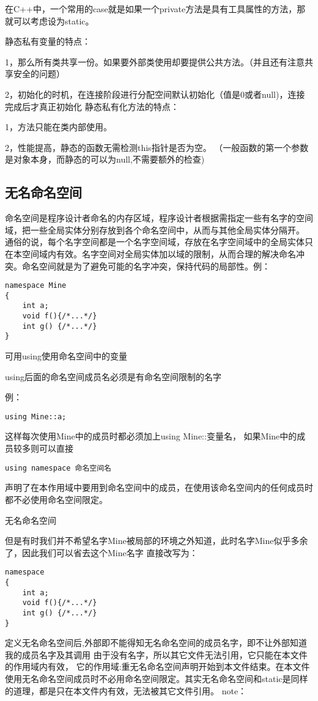 在C++中，一个常用的case就是如果一个private方法是具有工具属性的方法，那就可以考虑设为static。

静态私有变量的特点：

1，那么所有类共享一份。如果要外部类使用却要提供公共方法。（并且还有注意共享安全的问题）

2，初始化的时机，在连接阶段进行分配空间默认初始化（值是0或者null)，连接完成后才真正初始化
静态私有化方法的特点：

1，方法只能在类内部使用。

2，性能提高，静态的函数无需检测this指针是否为空。
    （一般函数的第一个参数是对象本身，而静态的可以为null,不需要额外的检查)
\subsection{无名命名空间}
命名空间是程序设计者命名的内存区域，程序设计者根据需指定一些有名字的空间域，把一些全局实体分别存放到各个命名空间中，从而与其他全局实体分隔开。
通俗的说，每个名字空间都是一个名字空间域，存放在名字空间域中的全局实体只在本空间域内有效。名字空间对全局实体加以域的限制，从而合理的解决命名冲突。命名空间就是为了避免可能的名字冲突，保持代码的局部性。例：
\begin{lstlisting}
namespace Mine  
{  
    int a;  
    void f(){/*...*/}  
    int g() {/*...*/}  
}  
\end{lstlisting}
可用using使用命名空间中的变量

using后面的命名空间成员名必须是有命名空间限制的名字

例：
\begin{lstlisting}
using Mine::a;
\end{lstlisting}
这样每次使用Mine中的成员时都必须加上using Mine::变量名，
如果Mine中的成员较多则可以直接
\begin{lstlisting}
using namespace 命名空间名
\end{lstlisting}

声明了在本作用域中要用到命名空间中的成员，在使用该命名空间内的任何成员时都不必使用命名空间限定。

无名命名空间

但是有时我们并不希望名字Mine被局部的环境之外知道，此时名字Mine似乎多余了，因此我们可以省去这个Mine名字 直接改写为：
\begin{lstlisting}
namespace   
{  
    int a;  
    void f(){/*...*/}  
    int g() {/*...*/}  
}  
\end{lstlisting}

定义无名命名空间后,外部即不能得知无名命名空间的成员名字，即不让外部知道我的成员名字及其调用
由于没有名字，所以其它文件无法引用，它只能在本文件的作用域内有效，
它的作用域:重无名命名空间声明开始到本文件结束。在本文件使用无名命名空间成员时不必用命名空间限定。其实无名命名空间和static是同样的道理，都是只在本文件内有效，无法被其它文件引用。
note：

